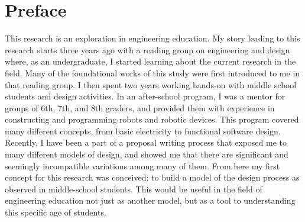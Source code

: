 \chapter*{Preface}
This research is an exploration in engineering education. My story leading to this research starts three years ago with a reading group on engineering and design where, as an undergraduate, I started learning about the current research in the field. Many of the foundational works of this study were first introduced to me in that reading group. I then spent two years working hands-on with middle school students and design activities. In an after-school program, I was a mentor for groups of 6th, 7th, and 8th graders, and provided them with experience in constructing and programming robots and robotic devices. This program covered many different concepts, from basic electricity to functional software design. Recently, I have been a part of a proposal writing process that exposed me to many different models of design, and showed me that there are significant and seemingly incompatible variations among many of them. From here my first concept for this research was conceived: to build a model of the design process as observed in middle-school students. %
This would be useful in the field of engineering education not just as another model, but as a tool to understanding this specific age of students.